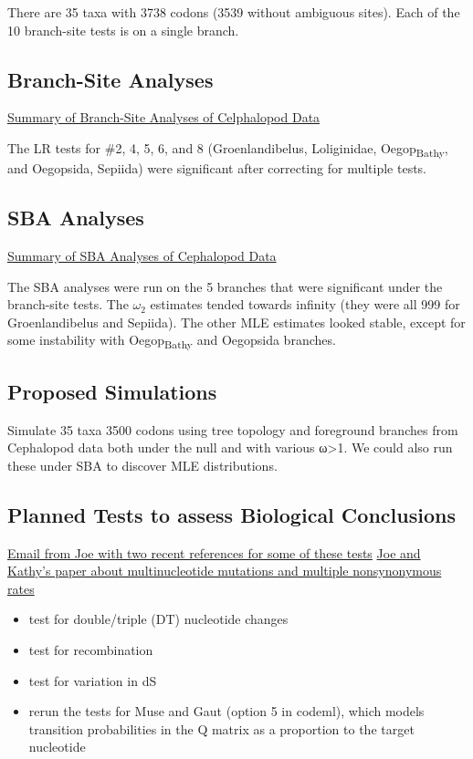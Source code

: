 \documentclass[11pt]{article}
\begin{document}
There are 35 taxa with 3738 codons (3539 without ambiguous sites).  Each of
the 10 branch-site tests is on a single branch.

\subsection{Branch-Site Analyses}
\label{sec:org993a25f}

\href{https://ftfl.ca/misc/bsa/cephalopod\_brs\_summary.pdf}{Summary of Branch-Site Analyses of Celphalopod Data}

The LR tests for \#2, 4, 5, 6, and 8 (Groenlandibelus, Loliginidae,
Oegop\textsubscript{Bathy}, and Oegopsida, Sepiida) were significant after correcting for
multiple tests.

\subsection{SBA Analyses}
\label{sec:org55045a0}

\href{https://ftfl.ca/misc/bsa/cephalopod\_sba\_summary.pdf}{Summary of SBA Analyses of Cephalopod Data}

The SBA analyses were run on the 5 branches that were significant under the
branch-site tests.  The \(\omega_2\) estimates tended towards infinity (they
were all 999 for Groenlandibelus and Sepiida).  The other MLE estimates
looked stable, except for some instability with Oegop\textsubscript{Bathy} and Oegopsida
branches.


\subsection{Proposed Simulations}
\label{sec:org41104f2}

Simulate 35 taxa 3500 codons using tree topology and foreground branches from
Cephalopod data both under the null and with various ω>1.  We could also run
these under SBA to discover MLE distributions.

\subsection{Planned Tests to assess Biological Conclusions}
\label{sec:org958b8ee}
\href{nnml:Dal\#93BCA37A-0B0B-422E-8C39-09ED9A419A2F@dal.ca}{Email from Joe with two recent references for some of these tests} \href{file:///home/jrm/files/edu/papers/Improved\_inference\_of\_site-specific\_positive\_selection\_under\_a\_generalized\_parametric\_codon\_model\_when\_there\_are\_multinucleotide\_mutations\_and\_multiple\_nonsynonymous\_rates\_-\_Dunn\_et\_al\_-\_2019\_-\_BMC\_Evolutionary\_Biology\_.pdf}{Joe and
Kathy's paper about multinucleotide mutations and multiple nonsynonymous
rates}
\begin{itemize}
\item test for double/triple (DT) nucleotide changes
\item test for recombination
\item test for variation in dS
\item rerun the tests for Muse and Gaut (option 5 in codeml), which models
transition probabilities in the Q matrix as a proportion to the target
nucleotide
\end{itemize}
\end{document}
